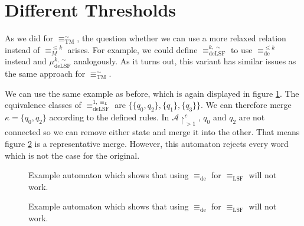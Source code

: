 \section{Different Thresholds}

As we did for $\equiv_\text{TM}^\sim$, the question whether we can use a more relaxed relation instead of $\equiv_M^{\leq k}$ arises. For example, we could define $\equiv^{k,\sim}_\text{deLSF}$ to use $\equiv_\text{de}^{\leq k}$ instead and $\mu^{k,\sim}_\text{deLSF}$ analogously. As it turns out, this variant has similar issues as the same approach for $\equiv_\text{TM}^\sim$.

We can use the same example as before, which is again displayed in figure \ref{fig:lsf:desim_counterex1}. The equivalence classes of $\equiv_\text{deLSF}^{1,\equiv_L}$ are $\{ \{q_0, q_2\}, \{q_1\}, \{q_3\} \}$. We can therefore merge $\kappa = \{q_0, q_2\}$ according to the defined rules. In $\mathcal{A} \upharpoonright^c_{> 1}$, $q_0$ and $q_2$ are not connected so we can remove either state and merge it into the other. That means figure \ref{fig:lsf:desim_counterex2} is a representative merge. However, this automaton rejects every word which is not the case for the original.

\begin{figure}
\centering
{}
\caption{Example automaton which shows that using $\equiv_\text{de}$ for $\equiv_\text{LSF}$ will not work.}
\label{fig:lsf:desim_counterex1}
\end{figure}

\begin{figure}
\centering
{}
\caption{Example automaton which shows that using $\equiv_\text{de}$ for $\equiv_\text{LSF}$ will not work.}
\label{fig:lsf:desim_counterex2}
\end{figure}














